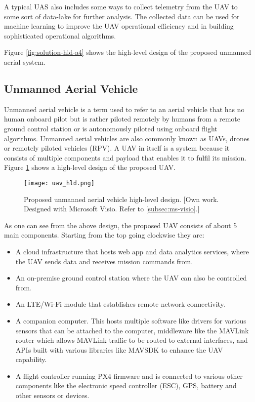A typical UAS also includes some ways to collect telemetry from the UAV to some sort of data-lake for further analysis. The collected data can be used for machine learning to improve the UAV operational efficiency and in building sophisticated operational algorithms.

Figure \ref{fig:solution-hld-a4} shows the high-level design of the proposed unmanned aerial system.



\subsection{Unmanned Aerial Vehicle}
\label{subsec:uav}

Unmanned aerial vehicle is a term used to refer to an aerial vehicle that has no human onboard pilot but is rather piloted remotely by humans from a remote ground control station or is autonomously piloted using onboard flight algorithms. Unmanned aerial vehicles are also commonly known as UAVs, drones or remotely piloted vehicles (RPV). A UAV in itself is a system because it consists of multiple components and payload that enables it to fulfil its mission. Figure \ref{fig:uav-hld} shows a high-level design of the proposed UAV.

\begin{figure}[H]
    \centering \texttt{[image: uav\_hld.png]}
    \caption{Proposed unmanned aerial vehicle high-level design. [Own work. Designed with Microsoft Visio. Refer to \ref{subsec:ms-visio}.]}
    \label{fig:uav-hld}
\end{figure}

As one can see from the above design, the proposed UAV consists of about 5 main components. Starting from the top going clockwise they are:
\begin{itemize}
    \item A cloud infrastructure that hosts web app and data analytics services, where the UAV sends data and receives mission commands from.
    \item An on-premise ground control station where the UAV can also be controlled from.
    \item An LTE/Wi-Fi module that establishes remote network connectivity.
    \item A companion computer. This hosts multiple software like drivers for various sensors that can be attached to the computer, middleware like the MAVLink router which allows MAVLink traffic to be routed to external interfaces, and APIs built with various libraries like MAVSDK \cite{mavsdk} to enhance the UAV capability.
    \item A flight controller running PX4 firmware and is connected to various other components like the electronic speed controller (ESC), GPS, battery and other sensors or devices.
\end{itemize}

